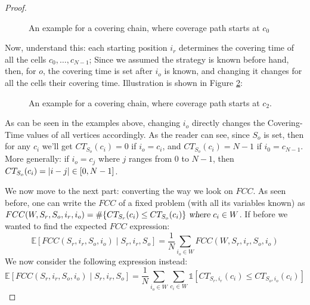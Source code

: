 \documentclass[a4paper,10pt]{article}
\newcommand\rob{\ensuremath{r}\xspace}
\newcommand\opp{\ensuremath{o}\xspace}
\newcommand{\fcc}{\ensuremath{FCC}\xspace}
\DeclarePairedDelimiter\abs{\lvert}{\rvert}%
\begin{document}
\begin{proof}
\begin{figure}
\caption{An example for a covering chain, where coverage path starts at $c_0$} \label{Figures: covering chain 1}
\end{figure}


Now, understand this: each starting position $i_r$ determines the covering time of all the cells $c_0, \hdots,\allowbreak c_{N-1}$; Since we assumed the strategy is known before hand, then, for \opp,  the covering time is set after $i_{\opp}$ is known, and changing it changes for all the cells their covering time. Illustration is shown in Figure \ref{Figures: covering chain 2}:

\begin{figure}
\centering
{}

\caption{An example for a covering chain, where coverage path starts at $c_2$.}
\label{Figures: covering chain 2}
\end{figure}
As can be seen in the examples above, changing $i_{\opp}$ directly changes the Covering-Time values of all vertices accordingly.
As the reader can see, since $S_{\opp}$ is set, then for any $c_i$ we'll get $CT_{S_{\opp}}(c_i)=0$ if $i_{\opp}=c_i$, and $CT_{S_{\opp}}(c_i)=N-1$ if $i_0=c_{N-1}$. More generally: if $i_{\opp}=c_j$ where $j$ ranges from $0$ to $N-1$, then $CT_{S_{\opp}}(c_i)=\abs{i-j}\in [0,N-1]$.

We now move to the next part: converting the way we look on \fcc. As seen before, one can write the \fcc of a fixed problem (with all its variables known) as $\fcc(W,S_{\rob},S_{\opp},i_r,i_{\opp})=\# \lbrace CT_{S_{\rob}}(c_i) \le CT_{S_{\opp}}(c_i)\rbrace \textsl{ where } c_i\in W$.
If before we wanted to find the expected \fcc expression: 
\[\mathbb{E}\left[\fcc\left( S_{\rob}, i_r, S_{\opp}, i_{\opp}\right) \mid S_{\rob}, i_r, S_{\opp}\right]=
\frac{1}{N}\sum_{i_{\opp}\in W}{\fcc\left(W,S_{\rob},i_r,S_{\opp},i_{\opp}\right)}\]
We now consider the following expression instead:
\[\mathbb{E}\left[\fcc\left( S_{\rob}, i_r, S_{\opp}, i_{\opp}\right) \mid  S_{\rob}, i_r, S_{\opp}\right]=
\frac{1}{N}\sum_{i_{\opp}\in W}{\sum_{c_i\in W}{\mathds{1}\left[CT_{S_{\rob},i_r}(c_i) \le CT_{S_{\opp},i_{\opp}}(c_i)\right]}}\]


\end{proof}
\end{document}
